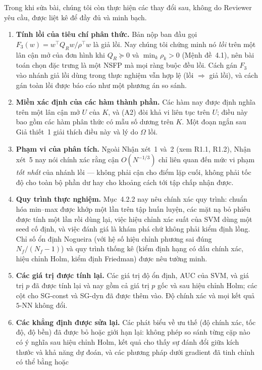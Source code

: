 \documentclass[11pt]{article}
\begin{document}
\noindent Trong khi sửa bài, chúng tôi còn thực hiện các thay đổi sau, không do
Reviewer yêu cầu, được liệt kê để đầy đủ và minh bạch.
\begin{enumerate}[leftmargin=1.6em,itemsep=3pt]
\item \textbf{Tính lồi của tiêu chí phân thức.} Bản nộp ban đầu gọi
  $F_3(w)=w^{\top}Q_Rw/\rho^{\top}w$ là giả lồi. Nay chúng tôi chứng minh nó \emph{lồi} trên một
  lân cận mở của đơn hình khi $Q_R\succeq0$ và $\min_k\rho_k>0$
  (Mệnh đề~4.1), nên bài toán chọn đặc trưng là một NSFP mà mọi ràng buộc đều lồi. Cách
  gán $F_3$ vào nhánh giả lồi dùng trong thực nghiệm vẫn hợp lệ
  (lồi $\Rightarrow$ giả lồi), và cách gán toàn lồi được báo cáo như một phương án
  so sánh.
\item \textbf{Miền xác định của các hàm thành phần.} Các hàm nay được định nghĩa trên một lân cận
  mở $U$ của $K$, và (A2) đòi khả vi liên tục trên $U$; điều này
  bao gồm các hàm phân thức có mẫu số dương trên $K$. Một đoạn ngắn sau
  Giả thiết~1 giải thích điều này và lý do $\Omega$ lồi.
\item \textbf{Phạm vi của phân tích.} Ngoài Nhận xét~1 và~2 (xem R1.1, R1.2), Nhận xét~5
  nay nói chính xác rằng cận $O(N^{-1/3})$ chỉ liên quan đến mức vi phạm \emph{tốt nhất}
  của nhánh lồi --- không phải cận cho điểm lặp cuối, không phải tốc độ cho toàn bộ phần dư hay
  cho khoảng cách tới tập chấp nhận được.
\item \textbf{Quy trình thực nghiệm.} Mục~4.2.2 nay nêu chính xác quy trình:
  chuẩn hóa min--max được khớp một lần trên tập huấn luyện, các mặt nạ bỏ phiếu được tính một lần
  rồi dùng lại, việc hiệu chỉnh xác suất của SVM dùng một seed cố định, và việc đánh giá là
  khám phá chứ không phải kiểm định lồng. Chỉ số ổn định Nogueira (với hệ số hiệu chỉnh phương sai đúng
  $N_f/(N_f-1)$) và quy trình thống kê (kiểm định hạng có dấu chính xác,
  hiệu chỉnh Holm, kiểm định Friedman) được nêu tường minh.
\item \textbf{Các giá trị được tính lại.} Các giá trị độ ổn định, AUC của SVM, và
  giá trị $p$ đã được tính lại và nay gồm cả giá trị $p$ gốc và sau hiệu chỉnh Holm; các cột cho
  SG-const và SG-dyn đã được thêm vào. Độ chính xác và mọi kết quả $5$-NN không đổi.
\item \textbf{Các khẳng định được sửa lại.} Các phát biểu về ưu thế (độ chính xác, tốc độ, độ bền)
  đã được bỏ hoặc giới hạn lại: không phép so sánh từng cặp nào có ý nghĩa sau hiệu chỉnh Holm,
  kết quả cho thấy sự đánh đổi giữa kích thước và khả năng dự đoán, và các phương pháp dưới gradient đã tinh chỉnh có thể bằng hoặc

\end{enumerate}
\end{document}

